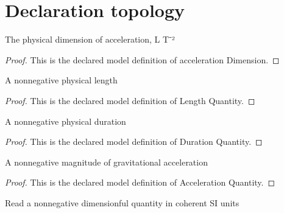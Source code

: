 \section{Declaration topology}
\begin{definition}
  \label{def:physics:phyx-mini-0693:phyxminiproblems-problemphyxmini0693-accelerationdimension}
  The physical dimension of acceleration, L T⁻²
\end{definition}
\begin{proof}
  This is the declared model definition of acceleration Dimension.
\end{proof}
\begin{definition}
  \label{def:physics:phyx-mini-0693:phyxminiproblems-problemphyxmini0693-lengthquantity}
  A nonnegative physical length
\end{definition}
\begin{proof}
  This is the declared model definition of Length Quantity.
\end{proof}
\begin{definition}
  \label{def:physics:phyx-mini-0693:phyxminiproblems-problemphyxmini0693-durationquantity}
  A nonnegative physical duration
\end{definition}
\begin{proof}
  This is the declared model definition of Duration Quantity.
\end{proof}
\begin{definition}
  \label{def:physics:phyx-mini-0693:phyxminiproblems-problemphyxmini0693-accelerationquantity}
  A nonnegative magnitude of gravitational acceleration
\end{definition}
\begin{proof}
  This is the declared model definition of Acceleration Quantity.
\end{proof}
\begin{definition}
  \label{def:physics:phyx-mini-0693:phyxminiproblems-problemphyxmini0693-nonnegativesireadout}
  Read a nonnegative dimensionful quantity in coherent SI units
\end{definition}
